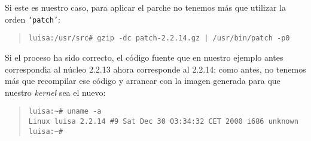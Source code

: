 Si este es nuestro caso, para aplicar el parche no tenemos m\'as que utilizar
la orden {\tt `patch'}:
\begin{quote}
\begin{verbatim}
luisa:/usr/src# gzip -dc patch-2.2.14.gz | /usr/bin/patch -p0
\end{verbatim}
\end{quote}
Si el proceso ha sido correcto, el c\'odigo fuente que en nuestro ejemplo antes 
correspond\'{\i}a al n\'ucleo 2.2.13 ahora corresponde al 2.2.14; como antes, 
no tenemos m\'as que recompilar ese c\'odigo y arrancar con la imagen generada
para que nuestro {\it kernel} sea el nuevo:
\begin{quote}
\begin{verbatim}
luisa:~# uname -a
Linux luisa 2.2.14 #9 Sat Dec 30 03:34:32 CET 2000 i686 unknown
luisa:~#
\end{verbatim}
\end{quote}
